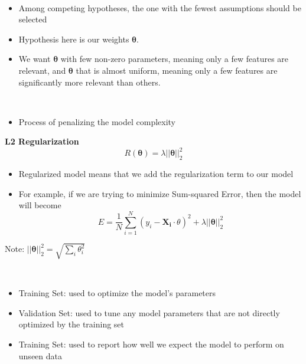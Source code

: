 \documentclass[12pt]{article}
\newenvironment{concept}[1]{\begin{trivlist}
		\item[\hskip \labelsep {\bfseries #1}]}{\end{trivlist}}
\begin{document}
\begin{concept}{Occam's razor}
	\	
	\begin{itemize}
		\item {
			Among competing hypotheses, the one with the fewest assumptions should be selected
		}
		\item {
			Hypothesis here is our weights $\boldsymbol{\theta}$.
		}
		\item {
			We want $\boldsymbol{\theta}$ with few non-zero parameters, meaning only a few features are relevant, and $\boldsymbol{\theta}$ that is
			almost uniform, meaning only a few features are significantly more relevant than others.
		}
	\end{itemize}
\end{concept}

\begin{concept}{Regularization}
	\
	\begin{itemize}
		\item {
			Process of penalizing the model complexity
		}
	\end{itemize}
	
	\textbf{L2 Regularization}
	$$R(\boldsymbol{\theta}) = \lambda ||\boldsymbol{\theta}||^2_2$$
	
	\begin{itemize}
		\item {
			Regularized model means that we add the regularization term to our model
		}
		\item {
			For example, if we are trying to minimize Sum-squared Error, then the model will become
			$$E = \frac{1}{N} \sum_{i=1}^{N} (y_i - \boldsymbol{X_i} \cdot \theta)^2 + \lambda ||\boldsymbol{\theta}||^2_2$$
		}
	\end{itemize}

	Note: $||\boldsymbol{\theta}||^2_2 = \sqrt{\sum_{i}^{} \theta_i ^2}$
\end{concept}

\begin{concept}{Data Sets}
	\
	\begin{itemize}
		\item {
			Training Set: used to optimize the model's parameters
		}
		\item {
			Validation Set: used to tune any model parameters that are not directly optimized by the training set
		}
		\item {
			Training Set: used to report how well we expect the model to perform on unseen data
		}
	\end{itemize}
\end{concept}
\end{document}

